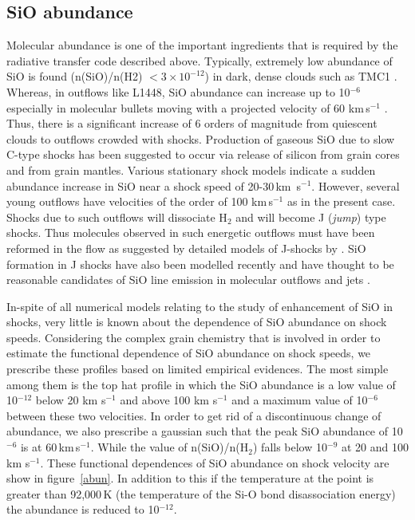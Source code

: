\documentclass[useAMS,usenatbib,letters]{mn2e}
\begin{document}
\subsection{SiO abundance}
\label{ssec:sioabun}
Molecular abundance is one of the important ingredients that is
required by the radiative transfer code described above. 
Typically, extremely low abundance of SiO is
found (n(SiO)/n(H2) $< 3\times10^{-12}$) in dark, dense clouds such
as TMC1 \citep{Ziurys:1989p14699,MartinPintado:1992p14309}. Whereas, in
outflows like L1448, SiO abundance can increase up to 10$^{-6}$ especially in
molecular bullets moving with a projected velocity of 60
km\,s$^{-1}$ \citep{Dutrey:1997p11185}. Thus, there is
a significant increase of 6 orders of magnitude from quiescent clouds
to outflows crowded with shocks. Production of
gaseous SiO due to slow C-type shocks has been suggested to occur via release of
silicon from grain cores and from grain mantles. Various stationary
shock models indicate a sudden abundance increase in SiO 
near a shock speed of 20-30\,km\, s$^{-1}$. However, several young
outflows have velocities of the order of 100 km\,s$^{-1}$ as in the present
case. Shocks due to such outflows will dissociate H$_{2}$ and will
become J ({\em{jump}}) type shocks. Thus molecules observed in such
energetic outflows must have been reformed in the flow as suggested by
detailed models of J-shocks by \cite{Neufeld:1989p14322}. SiO formation in J shocks
have also been modelled recently and have thought to be reasonable
candidates of SiO line emission in molecular outflows and jets
\citep{Guillet:2009p11229}.
%

In-spite of all numerical models relating to the study of enhancement
of SiO in shocks, very little is known about the dependence of SiO
abundance on shock speeds. Considering the complex grain
chemistry that is involved in order to estimate the functional
dependence of SiO abundance on shock speeds, we prescribe these
profiles based on limited empirical evidences. The most simple among
them is the top hat profile in which the SiO abundance is a low value of
10$^{-12}$ below 20 km s$^{-1}$ and above 100 km s$^{-1}$ and a
maximum value of 10$^{-6}$ between these two velocities.
In order to get rid of a discontinuous change of abundance, we also
prescribe a gaussian such that the peak SiO abundance of 10$^{-6}$ is at
60\,km\,s$^{-1}$. While the value of n(SiO)/n(H$_{2}$) falls below
10$^{-9}$ at 20 and 100 km s$^{-1}$. These functional dependences of SiO
abundance on shock velocity are show in figure~\ref{abun}.  
In addition to this if the temperature at the point is greater than
92,000\,K (the temperature of the Si-O bond disassociation energy) 
the abundance is reduced to 10$^{-12}$. 
%
\end{document}
